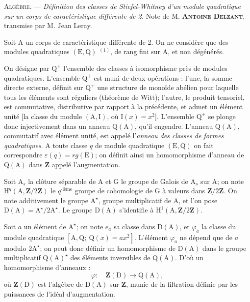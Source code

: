 
\textsc{Algèbre.} --- \textit{Définition des classes de Stiefel-Whitney d'un module
quadratique sur un corps de caractéristique différente de 2.}
Note de M. \textbf{\textsc{Antoine Delzant}}, transmise par M. Jean Leray.

Soit $\mathrm A$ un corps de caractéristique différente de 2. On ne considère que
des modules quadratiques $(\mathrm E,\mathrm Q)$ $^{(1)}$, de rang fini sur $\mathrm A$,
et non dégénérés.

On désigne par $\mathrm Q^+$ l'ensemble des classes à isomorphisme près de modules
quadratiques. L'ensemble $\mathrm Q^+$ est muni de deux opérations : l'une, la somme
directe externe, définit sur $\mathrm Q^+$ une structure de monoïde abélien pour laquelle
tous les éléments sont réguliers (théorème de Witt); l'autre, le produit tensoriel,
est commutative, distributive par rapport à la précédente, et admet un élément unité
[la classe du module $(\mathrm A,\mathrm I)$, où $\mathrm I(x)=x^2$].
L'ensemble $\mathrm Q^+$ se plonge donc injectivement dans un anneau $\mathrm Q(\mathrm A)$,
qu'il engendre. L'anneau $\mathrm Q(\mathrm A)$, commutatif avec élément unité, est appelé
l'\textit{anneau des classes de formes quadratiques}. A toute classe $q$ de module
quadratique $(\mathrm E,\mathrm Q)$ on fait correspondre $\varepsilon(q)=rg(\mathrm E)$;
on définit ainsi un homomorphisme d'anneau de $\mathrm Q(\mathrm A)$ dans $\mathbf Z$
appelé l'augmentation.

Soit $\mathrm A_s$ la clôture séparable de $\mathrm A$ et $\mathrm G$ le groupe de Galois
de $\mathrm A_s$ sur $\mathrm A$; on note $\mathrm H^q(\mathrm A,\mathbf Z/2\mathbf Z)$
le $q^{\text{-ième}}$ groupe de cohomologie de $\mathrm G$ à valeurs dans
$\mathbf Z/2\mathbf Z$. On note additivement le groupe $\mathrm A^\star$,
groupe multiplicatif de $\mathrm A$, et l'on pose
$\mathrm D(\mathrm A)=\mathrm A^\star/2\mathrm A^\star$.
Le groupe $\mathrm D(\mathrm A)$ s'identifie à
$\mathrm H^1(\mathrm A,\mathbf Z/2\mathbf Z)$.

Soit $a$ un élément de $\mathrm A^\star$; on note $e_a$ sa classe dans
$\mathrm D(\mathrm A)$, et $\varphi_a$ la classe du module quadratique
$[\mathrm A,\mathrm Q;\ \mathrm Q(x)=ax^2]$.
L'élément $\varphi_a$ ne dépend que de $a$ modulo $2\mathrm A^\star$;
on peut donc définir un homomorphisme de $\mathrm D(\mathrm A)$ dans le groupe
multiplicatif $\mathrm Q(\mathrm A)^\star$ des éléments inversibles de $\mathrm Q(\mathrm A)$.
D'où un homomorphisme d'anneaux :
\[
\varphi:\quad\mathbf Z(\mathrm D)\to\mathrm Q(\mathrm A),
\]
où $\mathbf Z(\mathrm D)$ est l'algèbre de $\mathrm D(\mathrm A)$ sur $\mathbf Z$,
munie de la filtration définie par les puissances de l'idéal d'augmentation.


